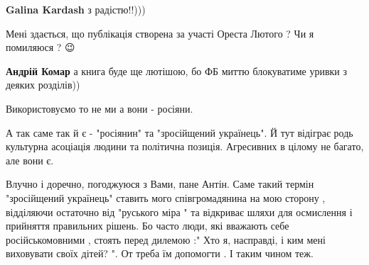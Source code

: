 \begin{itemize}
\begin{itemize}
\textbf{Galina Kardash} з радістю!!)))
\end{itemize}

 
Мені здається, що публікація створена за участі Ореста Лютого ? Чи я помиляюся
? 😉

\begin{itemize}
 
\textbf{Андрій Комар} а книга буде ще лютішою, бо ФБ миттю блокуватиме уривки з деяких розділів))
\end{itemize}

 

Використовуємо то не ми а вони - росіяни.

А так саме так й є - "росіянин" та "зросійщений українець". Й тут відіграє родь
культурна асоціація людини та політична позиція. Агресивних в цілому не багато,
але вони є.


 

Влучно і доречно, погоджуюся з Вами, пане Антін. Саме такий термін "зросійщений
українець" ставить мого співгромадянина на мою сторону , відділяючи остаточно
від "руського міра " та відкриває шляхи для осмислення і прийняття правильних
рішень. Бо часто люди, які вважають себе російськомовними , стоять перед дилемою
:" Хто я, насправді, і ким мені виховувати своїх дітей? ". От треба їм допомогти
. І таким чином теж.

\begin{itemize}
 

\end{itemize}
\end{itemize}

